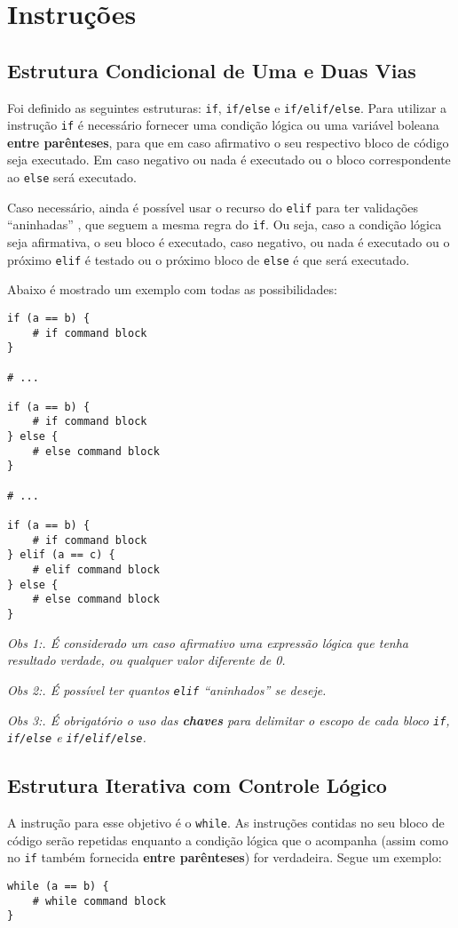 \documentclass[a4paper,12pt]{article}
\begin{document}
\section{Instruções}
\subsection{Estrutura Condicional de Uma e Duas Vias}
Foi definido as seguintes estruturas: \texttt{if}, \texttt{if/else} e \texttt{if/elif/else}.
Para utilizar a instrução \texttt{if} é necessário fornecer uma condição lógica ou uma variável
boleana \textbf{entre parênteses}, para que em caso afirmativo o seu respectivo bloco de código
seja executado. Em caso negativo ou nada é executado ou o bloco correspondente ao \texttt{else}
será executado.

Caso necessário, ainda é possível usar o recurso do \texttt{elif} para ter validações ``aninhadas''
, que seguem a mesma regra do \texttt{if}. Ou seja, caso a condição lógica seja afirmativa, o seu
bloco é executado, caso negativo, ou nada é executado ou o próximo \texttt{elif} é testado ou
o próximo bloco de \texttt{else} é que será executado.

Abaixo é mostrado um exemplo com todas as possibilidades:
\begin{lstlisting}
if (a == b) {
    # if command block
}

# ...

if (a == b) {
    # if command block
} else {
    # else command block
}

# ...

if (a == b) {
    # if command block
} elif (a == c) {
    # elif command block
} else {
    # else command block
}
\end{lstlisting}

\textit{Obs 1:. É considerado um caso afirmativo uma expressão lógica que tenha resultado verdade,
ou qualquer valor diferente de 0.}

\textit{Obs 2:. É possível ter quantos \texttt{elif} ``aninhados'' se deseje.}

\textit{Obs 3:. É obrigatório o uso das \textbf{chaves} para delimitar o escopo de cada bloco
\texttt{if}, \texttt{if/else} e \texttt{if/elif/else}.}

\subsection{Estrutura Iterativa com Controle Lógico}
A instrução para esse objetivo é o \texttt{while}. As instruções contidas no seu bloco de código
serão repetidas enquanto a condição lógica que o acompanha (assim como no \texttt{if} também
fornecida \textbf{entre parênteses}) for verdadeira. Segue um exemplo:
\begin{lstlisting}
while (a == b) {
    # while command block
}
\end{lstlisting}
\end{document}

